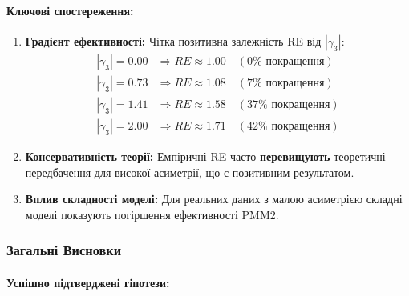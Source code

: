 \documentclass[12pt,a4paper]{article}
\begin{document}
\paragraph{Ключові спостереження:}

\begin{enumerate}
    \item \textbf{Градієнт ефективності:} Чітка позитивна залежність RE від $|\gamma_3|$:
    \begin{align*}
    |\gamma_3| = 0.00 &\Rightarrow RE \approx 1.00 \quad (0\% \text{ покращення}) \\
    |\gamma_3| = 0.73 &\Rightarrow RE \approx 1.08 \quad (7\% \text{ покращення}) \\
    |\gamma_3| = 1.41 &\Rightarrow RE \approx 1.58 \quad (37\% \text{ покращення}) \\
    |\gamma_3| = 2.00 &\Rightarrow RE \approx 1.71 \quad (42\% \text{ покращення})
    \end{align*}

    \item \textbf{Консервативність теорії:} Емпіричні RE часто \textbf{перевищують} теоретичні передбачення для високої асиметрії, що є позитивним результатом.

    \item \textbf{Вплив складності моделі:} Для реальних даних з малою асиметрією складні моделі показують погіршення ефективності PMM2.
\end{enumerate}

\subsubsection{Загальні Висновки}
\label{subsubsec:overall_conclusions}

\paragraph{Успішно підтверджені гіпотези:}
\end{document}
